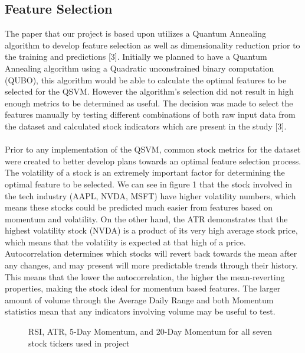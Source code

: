 \documentclass{article}
\begin{document}
\subsection*{Feature Selection}
The paper that our project is based upon utilizes a Quantum Annealing algorithm to develop feature selection as well as dimensionality reduction prior to the training and predictions [3]. Initially we planned to have a Quantum Annealing algorithm using a Quadratic unconstrained binary computation (QUBO), this algorithm would be able to calculate the optimal features to be selected for the QSVM. However the algorithm's selection did not result in high enough metrics to be determined as useful. The decision was made to select the features manually by testing different combinations of both raw input data from the dataset and calculated stock indicators which are present in the study [3]. \\ \\ Prior to any implementation of the QSVM, common stock metrics for the dataset were created to better develop plans towards an optimal feature selection process. The volatility of a stock is an extremely important factor for determining the optimal feature to be selected. We can see in figure 1 that the stock involved in the tech industry (AAPL, NVDA, MSFT) have higher volatility numbers, which means these stocks could be predicted much easier from features based on momentum and volatility. On the other hand, the ATR demonstrates that the highest volatility stock (NVDA) is a product of its very high average stock price, which means that the volatility is expected at that high of a price. Autocorrelation determines which stocks will revert back towards the mean after any changes, and may present will more predictable trends through their history. This means that the lower the autocorrelation, the higher the mean-reverting properties, making the stock ideal for momentum based features. The larger amount of volume through the Average Daily Range and both Momentum statistics mean that any indicators involving volume may be useful to test. 
\begin{figure}[H]
    \centering
    \caption{RSI, ATR, 5-Day Momentum, and 20-Day Momentum for all seven stock tickers used in project}
    \label{fig:1}
\end{figure}
\end{document}

